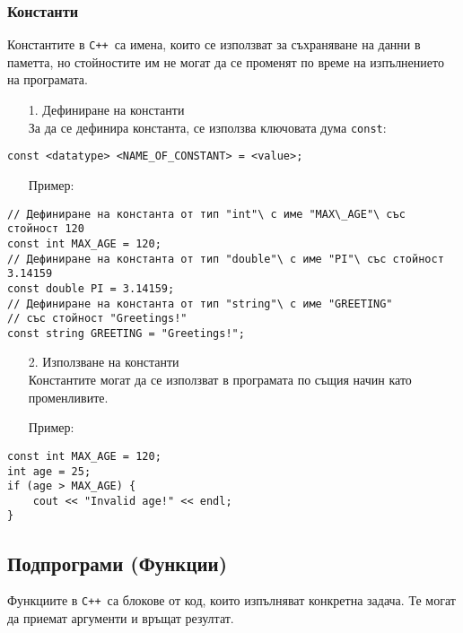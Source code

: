 \documentclass[oneside]{book}
\newcommand*{\code}[1]{\texttt{#1}}
\newcommand*{\cpp}{\texttt{C++}\ }
\begin{document}
\subsubsection{Константи}
Константите в \cpp са имена, които се използват за съхраняване на данни в паметта, но стойностите им не могат да се променят по време на изпълнението на програмата.

\begin{enumerate}
    \item[1.] Дефиниране на константи\\За да се дефинира константа, се използва ключовата дума \code{const}:
\end{enumerate}
\begin{mdframed}\begin{lstlisting}
const <datatype> <NAME_OF_CONSTANT> = <value>;
\end{lstlisting}\end{mdframed}
\begin{itemize}
    \item[Пример:]
\end{itemize} 
\begin{mdframed}\begin{lstlisting}
// Дефиниране на константа от тип "int"\ с име "MAX\_AGE"\ със стойност 120
const int MAX_AGE = 120;
// Дефиниране на константа от тип "double"\ с име "PI"\ със стойност 3.14159
const double PI = 3.14159;
// Дефиниране на константа от тип "string"\ с име "GREETING"
// със стойност "Greetings!"
const string GREETING = "Greetings!";
\end{lstlisting}\end{mdframed}
\begin{enumerate}
    \item[2.] Използване на константи\\Константите могат да се използват в програмата по същия начин като променливите.
\end{enumerate}
\begin{itemize}
    \item[Пример:]
\end{itemize}
\begin{mdframed}\begin{lstlisting}
const int MAX_AGE = 120;
int age = 25;
if (age > MAX_AGE) {
    cout << "Invalid age!" << endl;
}
\end{lstlisting}\end{mdframed}

\subsection{Подпрограми (Функции)}
Функциите в \cpp са блокове от код, които изпълняват конкретна задача. Те могат да приемат аргументи и връщат резултат.
\end{document}
